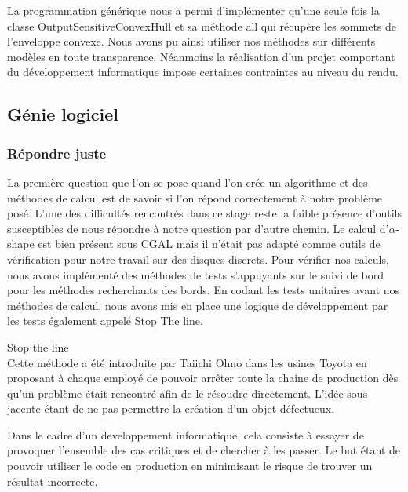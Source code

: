 La programmation générique nous a permi d'implémenter qu'une seule fois la classe OutputSensitiveConvexHull et sa méthode all qui récupère les sommets de l'enveloppe convexe. Nous avons pu ainsi utiliser nos méthodes sur différents modèles en toute transparence. Néanmoins la réalisation d'un projet comportant du développement informatique impose certaines contraintes au niveau du rendu. 

\subsection{Génie logiciel}

\subsubsection{Répondre juste}

La première question que l'on se pose quand l'on crée un algorithme et des méthodes de calcul est de savoir si l'on répond correctement à notre problème posé. L'une des difficultés rencontrés dans ce stage reste la faible présence d'outils susceptibles de nous répondre à notre question par d'autre chemin. Le calcul d'$\alpha$-shape est bien présent sous CGAL mais il n'était pas adapté comme outils de vérification pour notre travail sur des disques discrets. Pour vérifier nos calculs, nous avons implémenté des méthodes de tests s'appuyants sur le suivi de bord pour les méthodes recherchants des bords. En codant les tests unitaires avant nos méthodes de calcul, nous avons mis en place une logique de développement par les tests également appelé Stop The line. \cite{stoptheline}

\begin{Definition}{Stop the line}\\
\label{def:stopthline}
   Cette méthode a été introduite par Taiichi Ohno dans les usines Toyota en proposant à chaque employé de pouvoir arrêter toute la chaine de production dès qu'un problème était rencontré afin de le résoudre directement. L'idée sous-jacente étant de ne pas permettre la création d'un objet défectueux.
\end{Definition}

Dans le cadre d'un developpement informatique, cela consiste à essayer de provoquer l'ensemble des cas critiques et de chercher à les passer. Le but étant de pouvoir utiliser le code en production en minimisant le risque de trouver un résultat incorrecte.

